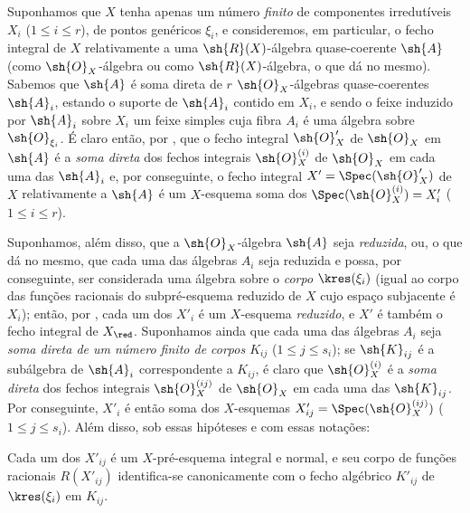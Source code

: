 \documentclass[oneside,10pt]{amsart}
\renewcommand{\leq}{\leqslant}
\newcommand{\oldpage}[2][]{\marginnote{\normalfont\footnotesize\textbf{#1}~|~#2}\ignorespaces}
\let\EGAOriginalLabel\label
\renewcommand{\label}[1]{\phantomsection\EGAOriginalLabel{#1}}
\begin{document}
\begin{env}[6.3.6]
\label{II.6.3.6}
Suponhamos que $X$ tenha apenas um número \emph{finito} de componentes irredutíveis $X_i$ ($1\leq i\leq r$), de pontos genéricos $\xi_i$, e consideremos, em particular, o fecho integral de $X$ relativamente a uma $\sh{R}(X)$-álgebra quase-coerente $\sh{A}$ (como $\sh{O}_X$-álgebra ou como $\sh{R}(X)$-álgebra, o que dá no mesmo).
Sabemos  que $\sh{A}$ é soma direta de $r$ $\sh{O}_X$-álgebras quase-coerentes $\sh{A}_i$, estando o suporte de $\sh{A}_i$ contido em $X_i$, e sendo o feixe induzido por $\sh{A}_i$ sobre $X_i$ um feixe simples cuja fibra $A_i$ é uma álgebra sobre $\sh{O}_{\xi_i}$.
É claro então, por , que o fecho integral $\sh{O}'_X$ de $\sh{O}_X$ em $\sh{A}$ é a \emph{soma direta} dos fechos integrais $\sh{O}_X^{(i)}$ de $\sh{O}_X$ em cada uma das $\sh{A}_i$ e, por conseguinte, o fecho integral $X'=\Spec(\sh{O}'_X)$ de $X$ relativamente a $\sh{A}$ é um $X$-esquema soma dos $\Spec(\sh{O}_X^{(i)})=X'_i$ ($1\leq i\leq r$).

Suponhamos, além disso, que a $\sh{O}_X$-álgebra $\sh{A}$ seja \emph{reduzida}, ou, o que dá no mesmo, que cada uma das álgebras $A_i$ seja reduzida e possa, por conseguinte, ser considerada uma álgebra sobre o \emph{corpo} $\kres(\xi_i)$ (igual ao corpo das funções racionais do subpré-esquema reduzido de $X$ cujo espaço subjacente é $X_i$);
então, por , cada um dos $X'_i$ é um $X$-esquema \emph{reduzido}, e $X'$ é também o fecho integral de $X_\red$.
Suponhamos ainda que cada uma das álgebras $A_i$ seja \emph{soma direta de um número finito de corpos $K_{ij}$} ($1\leq j\leq s_i$);
se $\sh{K}_{ij}$ é a subálgebra de $\sh{A}_i$ correspondente a $K_{ij}$, é claro que $\sh{O}_X^{(i)}$ é a \emph{soma direta} dos fechos integrais $\sh{O}_X^{(ij)}$ de $\sh{O}_X$ em cada uma das $\sh{K}_{ij}$.
Por conseguinte, $X'_i$ é então soma dos $X$-esquemas $X'_{ij}=\Spec(\sh{O}_X^{(ij)})$ ($1\leq j\leq s_i$).
Além disso, sob essas hipóteses e com essas notações:
\end{env}

\oldpage[II]{119}
\begin{proposition}[6.3.7]
\label{II.6.3.7}
Cada um dos $X'_{ij}$ é um $X$-pré-esquema integral e normal, e seu corpo de funções racionais $R(X'_{ij})$ identifica-se canonicamente com o fecho algébrico $K'_{ij}$ de $\kres(\xi_i)$ em $K_{ij}$.
\end{proposition}
\end{document}
